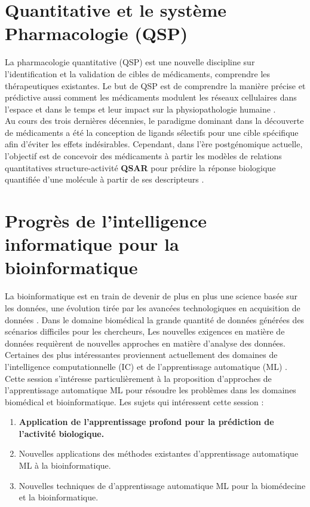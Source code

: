 \documentclass[12pt]{report}
\begin{document}
\newpage
\section{Quantitative et le système Pharmacologie (QSP)} 
La pharmacologie quantitative (QSP) est une nouvelle discipline sur l'identification et la validation de cibles de médicaments, comprendre les thérapeutiques existantes. Le but de QSP est de comprendre la manière précise et prédictive aussi comment les médicaments modulent les réseaux cellulaires dans l'espace et dans le temps et leur impact sur la physiopathologie humaine \cite{ref21}.\\
Au cours des trois dernières décennies, le paradigme dominant dans la découverte de médicaments a été la conception de ligands sélectifs pour une cible spécifique afin d'éviter les effets indésirables. Cependant, dans l'ère postgénomique actuelle, l'objectif est de concevoir des médicaments à partir les modèles de relations quantitatives structure-activité \textbf{QSAR} pour prédire la réponse biologique quantifiée d'une molécule à partir de ses descripteurs \cite{ref21} .

\section{Progrès de l'intelligence informatique pour la bioinformatique}
La bioinformatique est en train de devenir de plus en plus une science basée sur les données, une évolution tirée par les avancées technologiques en acquisition de données . Dans le domaine biomédical la grande quantité de données générées des scénarios difficiles pour les chercheurs, Les nouvelles exigences en matière de données requièrent de nouvelles approches en matière d'analyse des données. Certaines des plus intéressantes proviennent actuellement des domaines de l'intelligence computationnelle (IC) et de l'apprentissage automatique (ML) \cite{ref21}.\\
Cette session s'intéresse particulièrement à la proposition d'approches  de l'apprentissage automatique ML pour résoudre les problèmes dans les domaines biomédical et bioinformatique. Les sujets qui intéressent cette session :
\begin{enumerate}

\item \textbf{ Application de l'apprentissage profond pour la prédiction de l'activité biologique.}
\item Nouvelles applications des méthodes existantes d'apprentissage automatique ML à la bioinformatique.
\item Nouvelles techniques de d'apprentissage automatique ML pour la biomédecine et la bioinformatique.

\end{enumerate}
\newpage
\end{document}

